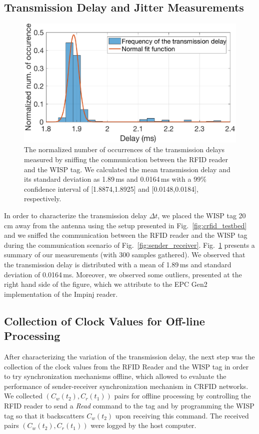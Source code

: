 \documentclass[10pt,journal,compsoc]{IEEEtran}
\begin{document}
\subsection{Transmission Delay and Jitter Measurements}

\begin{figure}
	\centering
	\includegraphics[width=0.9\columnwidth]{figures/sender_receiver_uncertainty.eps}
	\caption{\label{fig:transmission_delay} The normalized number of occurrences of the transmission delays measured by sniffing the communication between the RFID reader and the WISP tag. We calculated the mean transmission delay and its standard deviation as 1.89\,ms and 0.0164\,ms with a 99\% confidence interval of [1.8874,1.8925] and [0.0148,0.0184], respectively.}
\end{figure}

In order to characterize the transmission delay $\Delta t$, we placed the WISP tag 20 cm away from the antenna using the setup presented in Fig.~\ref{fig:crfid_testbed} and we sniffed the communication between the RFID reader and the WISP tag during the communication scenario of Fig.~\ref{fig:sender_receiver}. Fig.~\ref{fig:transmission_delay} presents a summary of our measurements (with 300 samples gathered). We observed that the transmission delay is distributed with a mean of 1.89\,ms and standard deviation of 0.0164\,ms. Moreover, we observed some outliers, presented at the right hand side of the figure, which we attribute to the EPC Gen2 implementation of the Impinj reader. 

\subsection{Collection of Clock Values for Off-line Processing}

After characterizing the variation of the transmission delay, the next step was the collection of the clock values from the RFID Reader and the WISP tag in order to try synchronization mechanisms offline, which allowed to evaluate the performance of sender-receiver synchronization mechanism in CRFID networks. We collected $(C_w(t_2),C_r(t_1))$ pairs for offline processing by controlling the RFID reader to send a \emph{Read} command to the tag and by programming the WISP tag so that it backscatters $C_w(t_2)$ upon receiving this command. The received pairs $(C_w(t_2),C_r(t_1))$ were logged by the host computer. 
\end{document}
